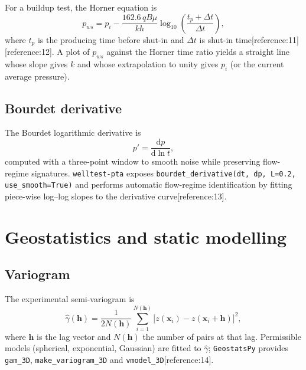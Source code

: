 \documentclass[10pt,a4paper]{article}
\newcommand{\dd}{\mathrm{d}}
\begin{document}
For a buildup test, the Horner equation is
\begin{equation}
  p_{ws} = p_i - \frac{162.6\,q B \mu}{k h}
  \log_{10}\!\left(\frac{t_p + \Delta t}{\Delta t}\right),
  \label{eq:horner}
\end{equation}
where $t_p$ is the producing time before shut-in and $\Delta t$ is shut-in
time[reference:11][reference:12]. A plot of $p_{ws}$ against the Horner time
ratio yields a straight line whose slope gives $k$ and whose extrapolation to
unity gives $p_i$ (or the current average pressure).

\subsection{Bourdet derivative}

The Bourdet logarithmic derivative is
\begin{equation}
  p' = \frac{\dd p}{\dd \ln t},
  \label{eq:bourdet}
\end{equation}
computed with a three-point window to smooth noise while preserving flow-regime
signatures. \texttt{welltest-pta} exposes \texttt{bourdet\_derivative(dt, dp, L=0.2, use\_smooth=True)}
and performs automatic flow-regime identification by fitting piece-wise
log--log slopes to the derivative curve[reference:13].

\section{Geostatistics and static modelling}

\subsection{Variogram}

The experimental semi-variogram is
\begin{equation}
  \hat{\gamma}(\bm{h}) = \frac{1}{2N(\bm{h})}
  \sum_{i=1}^{N(\bm{h})}\bigl[z(\bm{x}_i)-z(\bm{x}_i+\bm{h})\bigr]^2,
  \label{eq:variogram}
\end{equation}
where $\bm{h}$ is the lag vector and $N(\bm{h})$ the number of pairs at that
lag. Permissible models (spherical, exponential, Gaussian) are fitted to
$\hat{\gamma}$; \texttt{GeostatsPy} provides \texttt{gam\_3D},
\texttt{make\_variogram\_3D} and \texttt{vmodel\_3D}[reference:14].
\end{document}
